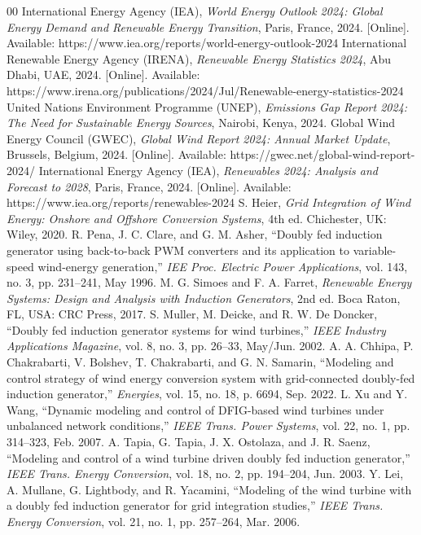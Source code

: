 \documentclass[conference]{IEEEtran}
\begin{document}
\begin{thebibliography}{00}
 International Energy Agency (IEA), \textit{World Energy Outlook 2024: Global Energy Demand and Renewable Energy Transition}, Paris, France, 2024. [Online]. Available: https://www.iea.org/reports/world-energy-outlook-2024
 International Renewable Energy Agency (IRENA), \textit{Renewable Energy Statistics 2024}, Abu Dhabi, UAE, 2024. [Online]. Available: https://www.irena.org/publications/2024/Jul/Renewable-energy-statistics-2024
 United Nations Environment Programme (UNEP), \textit{Emissions Gap Report 2024: The Need for Sustainable Energy Sources}, Nairobi, Kenya, 2024.
 Global Wind Energy Council (GWEC), \textit{Global Wind Report 2024: Annual Market Update}, Brussels, Belgium, 2024. [Online]. Available: https://gwec.net/global-wind-report-2024/
 International Energy Agency (IEA), \textit{Renewables 2024: Analysis and Forecast to 2028}, Paris, France, 2024. [Online]. Available: https://www.iea.org/reports/renewables-2024
 S. Heier, \textit{Grid Integration of Wind Energy: Onshore and Offshore Conversion Systems}, 4th ed. Chichester, UK: Wiley, 2020.
 R. Pena, J. C. Clare, and G. M. Asher, ``Doubly fed induction generator using back-to-back PWM converters and its application to variable-speed wind-energy generation,'' \textit{IEE Proc. Electric Power Applications}, vol. 143, no. 3, pp. 231--241, May 1996.
 M. G. Simoes and F. A. Farret, \textit{Renewable Energy Systems: Design and Analysis with Induction Generators}, 2nd ed. Boca Raton, FL, USA: CRC Press, 2017.
 S. Muller, M. Deicke, and R. W. De Doncker, ``Doubly fed induction generator systems for wind turbines,'' \textit{IEEE Industry Applications Magazine}, vol. 8, no. 3, pp. 26--33, May/Jun. 2002.
 A. A. Chhipa, P. Chakrabarti, V. Bolshev, T. Chakrabarti, and G. N. Samarin, ``Modeling and control strategy of wind energy conversion system with grid-connected doubly-fed induction generator,'' \textit{Energies}, vol. 15, no. 18, p. 6694, Sep. 2022.
 L. Xu and Y. Wang, ``Dynamic modeling and control of DFIG-based wind turbines under unbalanced network conditions,'' \textit{IEEE Trans. Power Systems}, vol. 22, no. 1, pp. 314--323, Feb. 2007.
 A. Tapia, G. Tapia, J. X. Ostolaza, and J. R. Saenz, ``Modeling and control of a wind turbine driven doubly fed induction generator,'' \textit{IEEE Trans. Energy Conversion}, vol. 18, no. 2, pp. 194--204, Jun. 2003.
 Y. Lei, A. Mullane, G. Lightbody, and R. Yacamini, ``Modeling of the wind turbine with a doubly fed induction generator for grid integration studies,'' \textit{IEEE Trans. Energy Conversion}, vol. 21, no. 1, pp. 257--264, Mar. 2006.

\end{thebibliography}
\end{document}
